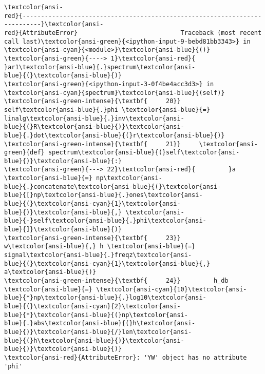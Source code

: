 \documentclass[a4paper,11pt,final]{article}
\begin{document}
\begin{Verbatim}[commandchars=\\\{\},frame=leftline,fontsize=\small, xleftmargin=0.5em]
\textcolor{ansi-
red}{---------------------------------------------------------------------------}\textcolor{ansi-
red}{AttributeError}                            Traceback (most recent
call last)\textcolor{ansi-green}{<ipython-input-9-bebd81bb3343>} in
\textcolor{ansi-cyan}{<module>}\textcolor{ansi-blue}{()}
\textcolor{ansi-green}{----> 1}\textcolor{ansi-red}{
}ar1\textcolor{ansi-blue}{.}spectrum\textcolor{ansi-
blue}{(}\textcolor{ansi-blue}{)}
\textcolor{ansi-green}{<ipython-input-3-0f4be4acc3d3>} in
\textcolor{ansi-cyan}{spectrum}\textcolor{ansi-blue}{(self)}
\textcolor{ansi-green-intense}{\textbf{     20}}
self\textcolor{ansi-blue}{.}phi \textcolor{ansi-blue}{=}
linalg\textcolor{ansi-blue}{.}inv\textcolor{ansi-
blue}{(}R\textcolor{ansi-blue}{)}\textcolor{ansi-
blue}{.}dot\textcolor{ansi-blue}{(}r\textcolor{ansi-blue}{)}
\textcolor{ansi-green-intense}{\textbf{     21}}     \textcolor{ansi-
green}{def} spectrum\textcolor{ansi-blue}{(}self\textcolor{ansi-
blue}{)}\textcolor{ansi-blue}{:}
\textcolor{ansi-green}{---> 22}\textcolor{ansi-red}{         }a
\textcolor{ansi-blue}{=} np\textcolor{ansi-
blue}{.}concatenate\textcolor{ansi-blue}{(}\textcolor{ansi-
blue}{[}np\textcolor{ansi-blue}{.}ones\textcolor{ansi-
blue}{(}\textcolor{ansi-cyan}{1}\textcolor{ansi-
blue}{)}\textcolor{ansi-blue}{,} \textcolor{ansi-
blue}{-}self\textcolor{ansi-blue}{.}phi\textcolor{ansi-
blue}{]}\textcolor{ansi-blue}{)}
\textcolor{ansi-green-intense}{\textbf{     23}}
w\textcolor{ansi-blue}{,} h \textcolor{ansi-blue}{=}
signal\textcolor{ansi-blue}{.}freqz\textcolor{ansi-
blue}{(}\textcolor{ansi-cyan}{1}\textcolor{ansi-blue}{,}
a\textcolor{ansi-blue}{)}
\textcolor{ansi-green-intense}{\textbf{     24}}         h_db
\textcolor{ansi-blue}{=} \textcolor{ansi-cyan}{10}\textcolor{ansi-
blue}{*}np\textcolor{ansi-blue}{.}log10\textcolor{ansi-
blue}{(}\textcolor{ansi-cyan}{2}\textcolor{ansi-
blue}{*}\textcolor{ansi-blue}{(}np\textcolor{ansi-
blue}{.}abs\textcolor{ansi-blue}{(}h\textcolor{ansi-
blue}{)}\textcolor{ansi-blue}{/}len\textcolor{ansi-
blue}{(}h\textcolor{ansi-blue}{)}\textcolor{ansi-
blue}{)}\textcolor{ansi-blue}{)}
\textcolor{ansi-red}{AttributeError}: 'YW' object has no attribute
'phi'
\end{Verbatim}
\end{document}
